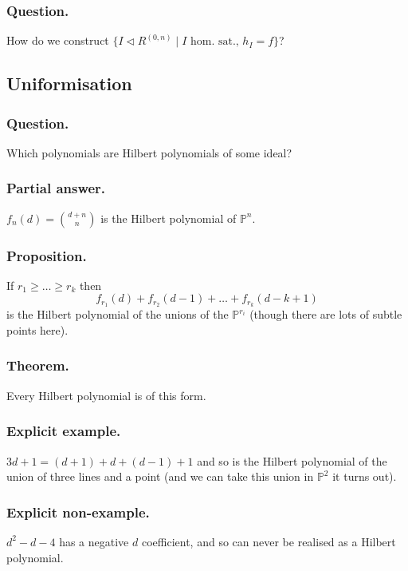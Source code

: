 \documentclass[10pt]{article}
\numberwithin{equation}{subsubsection}
\renewcommand{\P}{\mathbb{P}}
\begin{document}
            \subsubsection{Question.} How do we construct $\{I\triangleleft R^{(0,n)}\mid I\text{ hom. sat., }h_I=f\}$?
        
        \subsection{Uniformisation}
        
            \subsubsection{Question.} Which polynomials are Hilbert polynomials of some ideal?
            
            \subsubsection{Partial answer.} $f_n(d)=\binom{d+n}{n}$ is the Hilbert polynomial of $\P^n$.
            
            \subsubsection{Proposition.} If $r_1\geqslant\ldots\geqslant r_k$ then \[f_{r_1}(d)+f_{r_2}(d-1)+\ldots+f_{r_k}(d-k+1)\] is the Hilbert polynomial of the unions of the $\P^{r_i}$ (though there are lots of subtle points here).
            
            \subsubsection{Theorem.} Every Hilbert polynomial is of this form.
            
            \subsubsection{Explicit example.} $3d+1=(d+1)+d+(d-1)+1$ and so is the Hilbert polynomial of the union of three lines and a point (and we can take this union in $\P^2$ it turns out).
            
            \subsubsection{Explicit non-example.} $d^2-d-4$ has a negative $d$ coefficient, and so can never be realised as a Hilbert polynomial.
            
\end{document}
